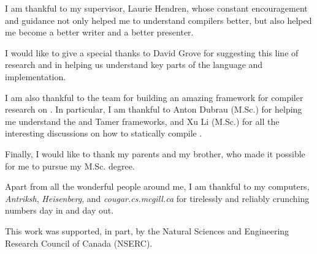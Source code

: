 I am thankful to my supervisor, Laurie Hendren, whose constant encouragement and
guidance not only helped me to understand compilers better, but also helped me
become a better writer and a better presenter.

I would like to give a special thanks to David Grove for suggesting this line of
research and in helping us understand key parts of the \xten language and
implementation.

I am also thankful to the \mclab team for building an amazing framework for
compiler research on \matlab. In particular, I am thankful to Anton Dubrau
(M.Sc.) for helping me understand the \mcsaf and Tamer frameworks, and Xu Li
(M.Sc.) for all the interesting discussions on how to statically compile
\matlab.

Finally, I would like to thank my parents and my brother, who made it possible
for me to pursue my M.Sc. degree.

Apart from all the wonderful people around me, I am thankful to my computers,
\emph{Antriksh}, \emph{Heisenberg}, and \emph{cougar.cs.mcgill.ca} for
tirelessly and reliably crunching numbers day in and day out.

This work was supported, in part, by the Natural Sciences and Engineering
Research Council of Canada (NSERC).   

